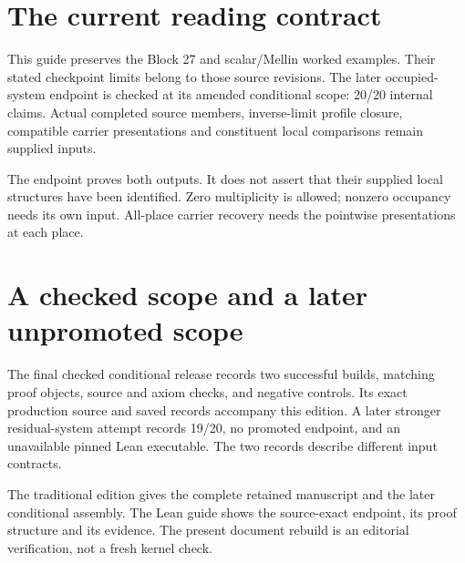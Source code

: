 \documentclass[12pt,a4paper]{article}
\begin{document}
\KomorebiCover

\section*{The current reading contract}
This guide preserves the Block 27 and scalar/Mellin worked examples. Their stated checkpoint limits belong to those source revisions. The later occupied-system endpoint is checked at its amended conditional scope: 20/20 internal claims. Actual completed source members, inverse-limit profile closure, compatible carrier presentations and constituent local comparisons remain supplied inputs.
\begin{center}
\end{center}
The endpoint proves both outputs. It does not assert that their supplied local structures have been identified. Zero multiplicity is allowed; nonzero occupancy needs its own input. All-place carrier recovery needs the pointwise presentations at each place.
\clearpage
\section*{A checked scope and a later unpromoted scope}
The final checked conditional release records two successful builds, matching proof objects, source and axiom checks, and negative controls. Its exact production source and saved records accompany this edition. A later stronger residual-system attempt records 19/20, no promoted endpoint, and an unavailable pinned Lean executable. The two records describe different input contracts.

The traditional edition gives the complete retained manuscript and the later conditional assembly. The Lean guide shows the source-exact endpoint, its proof structure and its evidence. The present document rebuild is an editorial verification, not a fresh kernel check.
\clearpage

\end{document}
